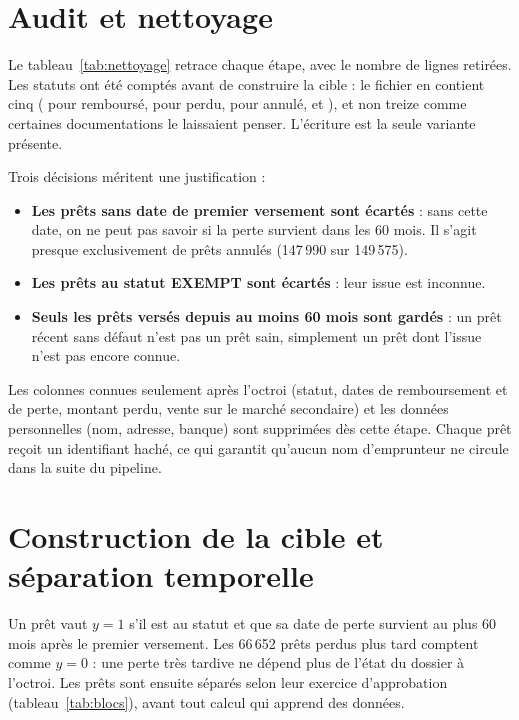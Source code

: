 \section{Audit et nettoyage}

Le tableau~\ref{tab:nettoyage} retrace chaque étape, avec le nombre de lignes retirées. Les statuts ont été comptés
avant de construire la cible : le fichier en contient cinq ( pour remboursé,  pour perdu,
 pour annulé,  et ), et non treize comme certaines documentations le laissaient
penser. L'écriture  est la seule variante présente.



Trois décisions méritent une justification :
\begin{itemize}
  \item \textbf{Les prêts sans date de premier versement sont écartés} : sans cette date, on ne peut pas savoir si la
        perte survient dans les 60 mois. Il s'agit presque exclusivement de prêts annulés (147\,990 sur 149\,575).
  \item \textbf{Les prêts au statut EXEMPT sont écartés} : leur issue est inconnue.
  \item \textbf{Seuls les prêts versés depuis au moins 60 mois sont gardés} : un prêt récent sans défaut n'est pas
        un prêt sain, simplement un prêt dont l'issue n'est pas encore connue.
\end{itemize}
Les colonnes connues seulement après l'octroi (statut, dates de remboursement et de perte, montant perdu, vente sur
le marché secondaire) et les données personnelles (nom, adresse, banque) sont supprimées dès cette étape. Chaque prêt
reçoit un identifiant haché, ce qui garantit qu'aucun nom d'emprunteur ne circule dans la suite du pipeline.

\section{Construction de la cible et séparation temporelle}

Un prêt vaut $y = 1$ s'il est au statut  et que sa date de perte survient au plus 60 mois après le premier
versement. Les 66\,652 prêts perdus plus tard comptent comme $y = 0$ : une perte très tardive ne dépend plus de l'état
du dossier à l'octroi. Les prêts sont ensuite séparés selon leur exercice d'approbation
(tableau~\ref{tab:blocs}), avant tout calcul qui apprend des données.

